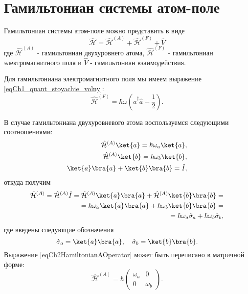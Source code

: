 \section{Гамильтониан системы атом-поле}
Гамильтониан системы атом-поле можно представить в виде
\begin{equation}
\hat{\mathcal{H}} = \hat{\mathcal{H}}^{(A)} +
\hat{\mathcal{H}}^{(F)} + \hat{V}
\nonumber
\end{equation}
где
$\hat{\mathcal{H}}^{(A)}$ - гамильтониан двухуровнего атома,
$\hat{\mathcal{H}}^{(F)}$ - гамильтониан электромагнитного поля и
$\hat{V}$ - гамильтониан взаимодействия.

Для гамильтониана электромагнитного поля мы имеем выражение
\eqref{eqCh1_quant_stoyachie_volny}:
\begin{equation}
\hat{\mathcal{H}}^{(F)} = \hbar \omega 
\left(\hat{a}^{\dag}\hat{a} + \frac{1}{2}\right).
\nonumber
\end{equation}

В случае гамильтониана двухуровневого атома воспользуемся следующими
соотношениями:
\begin{eqnarray}
\hat{\mathcal{H}}^{(A)}\ket{a} = \hbar \omega_a \ket{a},
\nonumber \\
\hat{\mathcal{H}}^{(A)}\ket{b} = \hbar \omega_b \ket{b},
\nonumber \\
\ket{a}\bra{a} + \ket{b}\bra{b} = \hat{I},
\nonumber
\end{eqnarray}
откуда получим
\begin{eqnarray}
\hat{\mathcal{H}}^{(A)} = \hat{\mathcal{H}}^{(A)}\hat{I} = 
\hat{\mathcal{H}}^{(A)}
\ket{a}\bra{a} + \hat{\mathcal{H}}^{(A)}
\ket{b}\bra{b} =
\nonumber \\
 = 
\hbar\omega_a
\ket{a}\bra{a} + \hbar\omega_b
\ket{b}\bra{b} =
\nonumber \\
= \hbar \omega_a \hat{\sigma}_a +
\hbar \omega_b \hat{\sigma}_b,
\label{eqCh2HamiltonianAOperator}
\end{eqnarray}
где введены следующие обозначения
\begin{equation}
\hat{\sigma}_a = \ket{a}\bra{a},
\quad
\hat{\sigma}_b = \ket{b}\bra{b}.
\nonumber
\end{equation}
Выражение \eqref{eqCh2HamiltonianAOperator} может быть переписано в
матричной форме:
\begin{equation}
\hat{\mathcal{H}}^{(A)} = \hbar 
\left(
\begin{array} {cc}
\omega_a & 0  
\\
0 & \omega_b 
\end{array}
\right).
\label{eqCh2HamiltonianA}
\end{equation}

